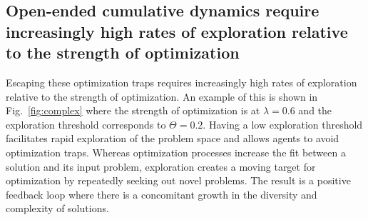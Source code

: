 \documentclass{article}
\begin{document}
\subsection{Open-ended cumulative dynamics require increasingly high rates of exploration relative to the strength of optimization}
Escaping these optimization traps requires increasingly high rates of exploration relative to the strength of optimization. An example of this is shown in Fig.~\ref{fig:complex} where the strength of optimization is at $\lambda=0.6$ and the exploration threshold corresponds to $\Theta=0.2$. Having a low exploration threshold facilitates rapid exploration of the problem space and allows agents to avoid optimization traps. Whereas optimization processes increase the fit between a solution and its input problem, exploration creates a moving target for optimization by repeatedly seeking out novel problems. The result is a positive feedback loop where there is a concomitant growth in the diversity and complexity of solutions.
\end{document}
